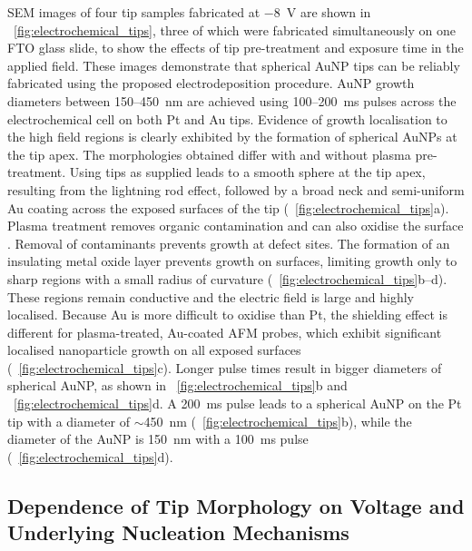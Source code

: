 \documentclass{article}
\begin{document}
SEM images of four tip samples fabricated at \SI{-8}{V} are shown in \figurename~\ref{fig:electrochemical_tips}, three of which were fabricated simultaneously on one FTO glass slide, to show the effects of tip pre-treatment and exposure time in the applied field. These images demonstrate that spherical AuNP tips can be reliably fabricated using the proposed electrodeposition procedure. AuNP growth diameters between 150--\SI{450}{nm} are achieved using 100--\SI{200}{ms} pulses across the electrochemical cell on both Pt and Au tips. Evidence of growth localisation to the high field regions is clearly exhibited by the formation of spherical AuNPs at the tip apex. The morphologies obtained differ with and without plasma pre-treatment. Using tips as supplied leads to a smooth sphere at the tip apex, resulting from the lightning rod effect, followed by a broad neck and semi-uniform Au coating across the exposed surfaces of the tip (\figurename~\ref{fig:electrochemical_tips}a). Plasma treatment removes organic contamination and can also oxidise the surface \cite{li2003, fuchs2009}. Removal of contaminants prevents growth at defect sites. The formation of an insulating metal oxide layer prevents growth on surfaces, limiting growth only to sharp regions with a small radius of curvature (\figurename~\ref{fig:electrochemical_tips}b--d). These regions remain conductive and the electric field is large and highly localised. Because Au is more difficult to oxidise than Pt, the shielding effect is different for plasma-treated, Au-coated AFM probes, which exhibit significant localised nanoparticle growth on all exposed surfaces (\figurename~\ref{fig:electrochemical_tips}c). Longer pulse times result in bigger diameters of spherical AuNP, as shown in \figurename~\ref{fig:electrochemical_tips}b and \figurename~\ref{fig:electrochemical_tips}d. A \SI{200}{ms} pulse leads to a spherical AuNP on the Pt tip with a diameter of $\sim$\SI{450}{nm} (\figurename~\ref{fig:electrochemical_tips}b), while the diameter of the AuNP is \SI{150}{nm} with a \SI{100}{ms} pulse (\figurename~\ref{fig:electrochemical_tips}d).

\subsection{Dependence of Tip Morphology on Voltage and Underlying Nucleation Mechanisms}
\end{document}
